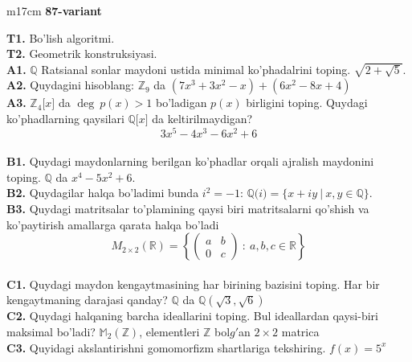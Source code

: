 \documentclass{article}
\begin{document}
\begin{tabular}{m{17cm}}
\textbf{87-variant}
\newline

\textbf{T1.} Bo'lish algoritmi. \\
\textbf{T2.} Geometrik konstruksiyasi. \\
\textbf{A1.} \(\mathbb{Q}\) Ratsianal sonlar maydoni ustida minimal ko'phadalrini toping.
\(\sqrt{2 + \sqrt{5}}\). \\
\textbf{A2.} Quydagini hisoblang:
\(\mathbb{Z}_{9}\) da \(\left( 7x^{3} + 3x^{2} - x \right) + \left( 6x^{2} - 8x + 4 \right)\) \\
\textbf{A3.} \(\mathbb{Z}_{4}\lbrack x\rbrack\) da \(\deg\ p(x) > 1\) bo'ladigan \(p(x)\) birligini toping. Quydagi ko'phadlarning qaysilari \(\mathbb{Q\lbrack}x\rbrack\) da keltirilmaydigan?
\[3x^{5} - 4x^{3} - 6x^{2} + 6\] \\
\textbf{B1.} Quydagi maydonlarning berilgan ko'phadlar orqali ajralish maydonini toping.
\(\mathbb{Q}\) da \(x^{4} - 5x^{2} + 6\). \\
\textbf{B2.} Quydagilar halqa bo'ladimi bunda \(i^{2} = - 1\):
\(\mathbb{Q(}i) = \{ x + iy\ |\ x,y \in \mathbb{Q\}}\). \\
\textbf{B3.} Quydagi matritsalar to'plamining qaysi biri matritsalarni qo'shish va ko'paytirish amallarga qarata halqa bo'ladi
\[M_{2 \times 2}\mathbb{(R) =}\left\{ \begin{pmatrix}
a & b \\
0 & c
\end{pmatrix}\ :\ a,b,c \in \mathbb{R} \right\}\] \\
\textbf{C1.} Quydagi maydon kengaytmasining har birining bazisini toping. Har bir kengaytmaning darajasi qanday?
\(\mathbb{Q}\) da \(\mathbb{Q}\left( \sqrt{3},\sqrt{6} \right)\) \\
\textbf{C2.} Quydagi halqaning barcha ideallarini toping. Bul ideallardan qaysi-biri maksimal bo'ladi?
\(\mathbb{M}_{2}\left( \mathbb{Z} \right)\), elementleri \(\mathbb{Z}\) bol\(g'\)an \(2 \times 2\) matrica \\
\textbf{C3.} Quyidagi akslantirishni gomomorfizm shartlariga tekshiring. \(f(x) = 5^{x}\) \\

\end{tabular}
\vspace{1cm}
\end{document}
